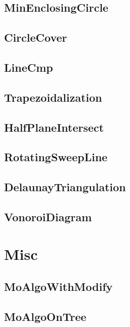 \subsection{MinEnclosingCircle}

\subsection{CircleCover}

\subsection{LineCmp}

\subsection{Trapezoidalization}

\subsection{HalfPlaneIntersect}

\subsection{RotatingSweepLine}

\subsection{DelaunayTriangulation}

\subsection{VonoroiDiagram}

\section{Misc}
\subsection{MoAlgoWithModify}

\subsection{MoAlgoOnTree}

